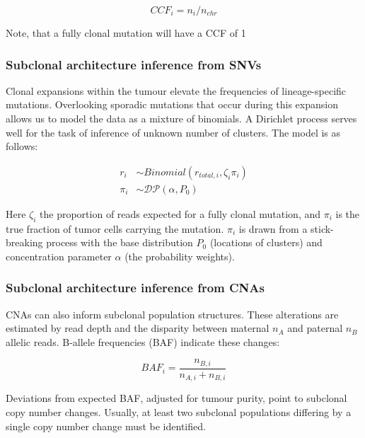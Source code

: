{    \begin{equation}
        CCF_i = n_i / n_{chr}
    \end{equation}

    Note, that a fully clonal mutation will have a \ac{CCF} of 1

    \subsubsection*{Subclonal architecture inference from \acp{SNV}}
    
    Clonal expansions within the tumour elevate the frequencies of lineage-specific mutations. Overlooking sporadic mutations that occur during this expansion allows us to model the data as a mixture of binomials. A Dirichlet process serves well for the task of inference of unknown number of clusters. The model is as follows:

    \begin{align}
        r_i &\sim Binomial(r_{total,i},\zeta_i\pi_i) \\
        \pi_i &\sim \mathcal{DP}(\alpha, P_0) 
    \end{align}

    Here $\zeta_i$  the proportion of reads expected for a fully clonal mutation, and $\pi_i$ is the true fraction of tumor cells carrying the mutation. $\pi_i$ is drawn from a stick-breaking process with the base distribution $P_0$ (locations of clusters) and concentration parameter $\alpha$ (the probability weights).

    \subsubsection*{Subclonal architecture inference from \acp{CNA}}

    \acp{CNA} can also inform subclonal population structures. These alterations are estimated by read depth and the disparity between maternal $n_A$  and paternal $n_B$ allelic reads. B-allele frequencies (BAF) indicate these changes:

    \begin{equation}
        BAF_i = \frac{n_{B,i} }{n_{A,i} + n_{B,i}} 
    \end{equation}
    
    Deviations from expected BAF, adjusted for tumour purity, point to subclonal copy number changes. Usually, at least two subclonal populations differing by a single copy number change must be identified.

}
